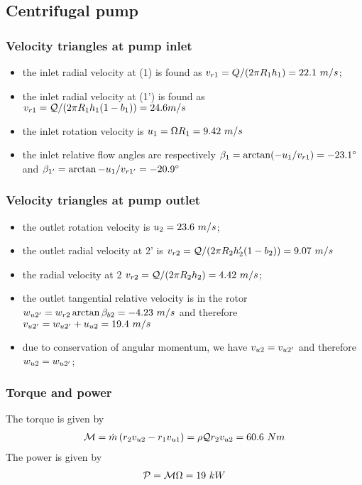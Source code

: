 \subsection*{Centrifugal pump}

\subsubsection*{Velocity triangles at pump inlet}

\begin{itemize}
\item the inlet radial velocity at (1) is found as $v_{r1} = Q/(2
  \pi R_1 h_1) = 22.1~m/s$;
\item the inlet radial velocity at (1') is found as $v_{r1} =
  \mathcal Q/(2 \pi R_1 h_1 (1-b_1)) = 24.6 m/s$
\item the inlet rotation velocity is $u_1 = \Omega R_1 = 9.42~m/s$
\item the inlet relative flow angles are respectively $\beta_1 =
  \arctan(-u_1/v_{r1}) = -23.1^\circ$ and $\beta_{1'} =
  \arctan{-u_1/\ensuremath{v}_{r1'}} = -20.9^\circ$
\end{itemize}


\subsubsection*{Velocity triangles at pump outlet}

\begin{itemize}
\item the outlet rotation velocity is $u_2 = 23.6~m/s$;
\item the outlet radial velocity at 2' is $v_{r2} = \mathcal Q/(2 \pi
  R_2 h_2' (1-b_2)) = 9.07~m/s$ 
\item the radial velocity at 2 $v_{r2} = \mathcal Q/(2 \pi R_2 h_2) = 4.42~m/s$;
\item the outlet tangential relative velocity is in the rotor
  $w_{u2'} = w_{r2} \arctan{\beta_{b2}} = - 4.23~m/s$ and
  therefore $v_{u2'} = w_{u2'} + u_{u2} = 19.4~m/s$
\item due to conservation of angular momentum, we have $v_{u2} =
  v_{u2'}$ and therefore $w_{u2} = w_{u2'}$;
\end{itemize}

\subsubsection*{Torque and power}

The torque is given by 
\begin{align*}
  \mathcal M
  = \dot m \left(r_2 v_{u2} - r_1 v_{u1} \right) 
  = \rho \mathcal Q r_2 v_{u2} = 60.6~Nm
\end{align*}
The power is given by
\begin{align*}
  \mathcal P = \mathcal M \Omega = 19~kW
\end{align*}